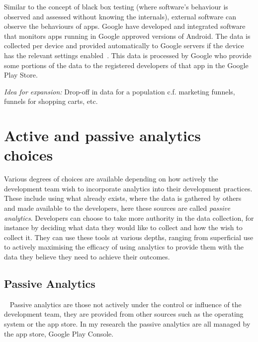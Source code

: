 Similar to the concept of black box testing (where software's behaviour is observed and assessed without knowing the internals), external software can observe the behaviours of apps. Google have developed and integrated software that monitors apps running in Google approved versions of Android. The data is collected per device and provided automatically to Google servers if the device has the relevant settings enabled~\cite{google_play_share_usage_and_diagnostics_info_with_google}. This data is processed by Google who provide some portions of the data to the registered developers of that app in the Google Play Store.

\emph{Idea for expansion:} Drop-off in data for a population  c.f. marketing funnels, funnels for shopping carts, etc.


\section{Active and passive analytics choices}
Various degrees of choices are available depending on how actively the development team wish to incorporate analytics into their development practices. These include using what already exists, where the data is gathered by others and made available to the developers, here these sources are called \emph{passive analytics}. Developers can choose to take more authority in the data collection, for instance by deciding what data they would like to collect and how the wish to collect it. They can use these tools at various depths, ranging from superficial use to actively maximising the efficacy of using analytics to provide them with the data they believe they need to achieve their outcomes.

\subsection{Passive Analytics}~\label{subsection-passive-analytics}
Passive analytics are those not actively under the control or influence of the development team, they are provided from other sources such as the operating system or the app store. In my research the passive analytics are all managed by the app store, Google Play Console.



